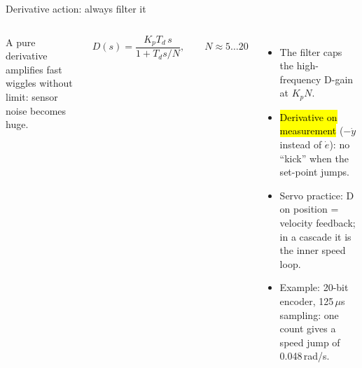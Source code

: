 \documentclass[aspectratio=169,10pt]{beamer}
\begin{document}
\begin{frame}{Derivative action: always filter it}
\begin{columns}[T]
\centering
{}
\small
A pure derivative amplifies fast wiggles without limit: sensor noise becomes huge.
\begin{eqbox}
\[
D(s)=\frac{K_pT_d\,s}{1+T_ds/N},\qquad N\approx5\ldots20
\]
\end{eqbox}
\footnotesize
\begin{itemize}
  \item The filter caps the high-frequency D-gain at $K_pN$.
  \item \hl{Derivative on measurement} ($-\dot y$ instead of $\dot e$): no ``kick'' when the set-point jumps.
  \item Servo practice: D on position = velocity feedback; in a cascade it is the inner speed loop.
  \item Example: 20-bit encoder, 125\,$\mu$s sampling: one count gives a speed jump of 0.048\,rad/s.
\end{itemize}
\end{columns}
\end{frame}
\end{document}
